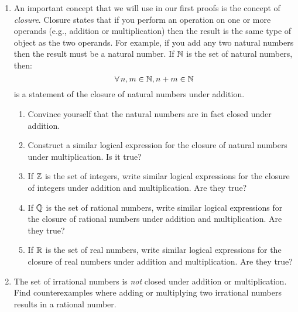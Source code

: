 \documentclass[letterpaper,12pt,fleqn]{article}
\begin{document}
\begin{enumerate}[left=0in,itemsep=0.5in]
\item An important concept that we will use in our first proofs is the concept of \emph{closure}.  Closure states
  that if you perform an operation on one or more operands (e.g., addition or multiplication) then the result is
  the same type of object as the two operands.  For example, if you add any two natural numbers then the result
  must be a natural number.  If \(\mathbb{N}\) is the set of natural numbers, then:
  \[\forall\,n,m\in\mathbb{N},n+m\in\mathbb{N}\]
  is a statement of the closure of natural numbers under addition.
  \begin{enumerate}
  \item Convince yourself that the natural numbers are in fact closed under addition.
  \item Construct a similar logical expression for the closure of natural numbers under multiplication.  Is it
    true?
  \item If \(\mathbb{Z}\) is the set of integers, write similar logical expressions for the closure of integers under
    addition and multiplication.  Are they true?
  \item If \(\mathbb{Q}\) is the set of rational numbers, write similar logical expressions for the closure of rational
    numbers under addition and multiplication.  Are they true?
  \item If \(\mathbb{R}\) is the set of real numbers, write similar logical expressions for the closure of real numbers
    under addition and multiplication.  Are they true?
  \end{enumerate}

\item The set of irrational numbers is \emph{not} closed under addition or multiplication.  Find counterexamples
  where adding or multiplying two irrational numbers results in a rational number.
\end{enumerate}
\end{document}
